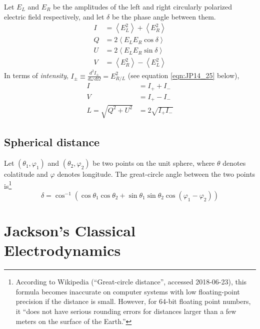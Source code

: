 \documentclass{article}
\newcommand{\phase}{\varphi}
\begin{document}
Let $E_L$ and $E_R$ be the amplitudes of the left and right circularly polarized electric field respectively, and let $\delta$ be the phase angle between them.
\begin{equation}
    \begin{aligned}
        I &= \left\langle E_L^2 \right\rangle + \left\langle E_R^2 \right\rangle \\
        Q &= 2\left\langle E_L E_R \cos\delta \right\rangle \\
        U &= 2\left\langle E_L E_R \sin\delta \right\rangle \\
        V &= \left\langle E_R^2 \right\rangle - \left\langle E_L^2 \right\rangle
    \end{aligned}
\end{equation}
In terms of \emph{intensity}, $I_\pm \equiv \frac{d^2I_\pm}{d\omega\,d\Omega} = E_{R/L}^2$ (see equation \ref{eqn:JP14_25} below),
\begin{equation}
    \begin{aligned}
        I &= I_+ + I_- \\
        V &= I_+ - I_- \\
        L = \sqrt{Q^2 + U^2} &= 2\sqrt{I_+ I_-}
    \end{aligned}
\end{equation}

\subsection{Spherical distance}

Let $(\theta_1,\phase_1)$ and $(\theta_2,\phase_2)$ be two points on the unit sphere, where $\theta$ denotes colatitude and $\phase$ denotes longitude.
The great-circle angle between the two points is\footnote{According to Wikipedia (``Great-circle distance'', accessed 2018-06-23), this formula becomes inaccurate on computer systems with low floating-point precision if the distance is small. However, for 64-bit floating point numbers, it ``does not have serious rounding errors for distances larger than a few meters on the surface of the Earth.''}
\begin{equation}
    \delta = \cos^{-1}(\cos\theta_1 \cos\theta_2 + \sin\theta_1 \sin\theta_2 \cos(\phase_1 - \phase_2))
\end{equation}

\section{Jackson's Classical Electrodynamics}
\end{document}
